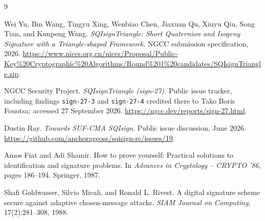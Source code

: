 \documentclass[11pt,a4paper]{article}
\begin{document}
\begin{thebibliography}{9}

Wei Yu, Bin Wang, Tingyu Xing, Wenbiao Chen, Jiaxuan Qu, Xiuyu Qiu,
Song Tian, and Kunpeng Wang.
\newblock \emph{SQIsignTriangle: Short Quaternion and Isogeny Signature with a
Triangle-shaped Framework}.
\newblock NGCC submission specification, 2026.
\newblock \url{https://www.niccs.org.cn/niccs/Proposal/Public-Key%20Cryptographic%20Algorithms/Round%201%20candidates/SQIsignTriangle.zip}.

NGCC Security Project.
\newblock \emph{SQIsignTriangle (sign-27)}.
\newblock Public issue tracker, including findings \texttt{sign-27-3} and
\texttt{sign-27-4} credited there to Tako Boris Fouotsa; accessed 27 September
2026.
\newblock \url{https://ngcc.dev/reports/sign-27.html}.

Dustin Ray.
\newblock \emph{Towards SUF-CMA SQIsign}.
\newblock Public issue discussion, June 2026.
\newblock \url{https://github.com/anchorageoss/sqisign-rs/issues/19}.

Amos Fiat and Adi Shamir.
\newblock How to prove yourself: Practical solutions to identification and
signature problems.
\newblock In \emph{Advances in Cryptology -- CRYPTO '86}, pages 186--194.
Springer, 1987.

Shafi Goldwasser, Silvio Micali, and Ronald L. Rivest.
\newblock A digital signature scheme secure against adaptive chosen-message
attacks.
\newblock \emph{SIAM Journal on Computing}, 17(2):281--308, 1988.

\end{thebibliography}
\end{document}
